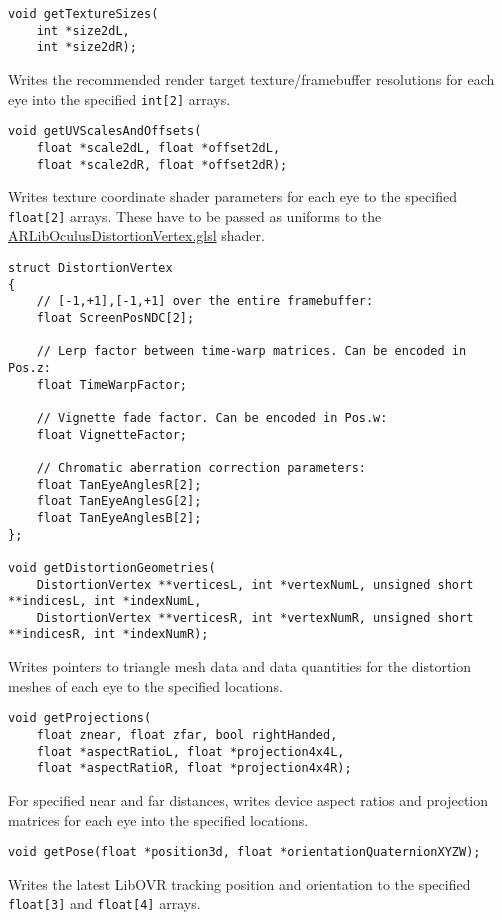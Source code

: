 \begin{lstlisting}
void getTextureSizes(
    int *size2dL,
    int *size2dR);
\end{lstlisting}
Writes the recommended render target texture/framebuffer resolutions for each eye into the specified \texttt{int{[}2{]}} arrays.

\begin{lstlisting}
void getUVScalesAndOffsets(
    float *scale2dL, float *offset2dL,
    float *scale2dR, float *offset2dR);
\end{lstlisting}
Writes texture coordinate shader parameters for each eye to the specified \texttt{float{[}2{]}} arrays.
These have to be passed as uniforms to the \href{https://github.com/ands/OculusMeetsAR/blob/master/ARLib/ogre_media/ARLibOculusDistortionVertex.glsl}{ARLibOculusDistortionVertex.glsl} shader.

\begin{lstlisting}
struct DistortionVertex
{
    // [-1,+1],[-1,+1] over the entire framebuffer:
    float ScreenPosNDC[2];

    // Lerp factor between time-warp matrices. Can be encoded in Pos.z:
    float TimeWarpFactor; 

    // Vignette fade factor. Can be encoded in Pos.w:
    float VignetteFactor;

    // Chromatic aberration correction parameters:
    float TanEyeAnglesR[2];
    float TanEyeAnglesG[2];
    float TanEyeAnglesB[2];
};

void getDistortionGeometries(
    DistortionVertex **verticesL, int *vertexNumL, unsigned short **indicesL, int *indexNumL,
    DistortionVertex **verticesR, int *vertexNumR, unsigned short **indicesR, int *indexNumR);
\end{lstlisting}
Writes pointers to triangle mesh data and data quantities for the distortion meshes of each eye to the specified locations.

\begin{lstlisting}
void getProjections(
    float znear, float zfar, bool rightHanded,
    float *aspectRatioL, float *projection4x4L,
    float *aspectRatioR, float *projection4x4R);
\end{lstlisting}
For specified near and far distances, writes device aspect ratios and projection matrices for each eye into the specified locations.

\begin{lstlisting}
void getPose(float *position3d, float *orientationQuaternionXYZW);
\end{lstlisting}
Writes the latest LibOVR tracking position and orientation to the specified \texttt{float{[}3{]}} and \texttt{float{[}4{]}} arrays.

